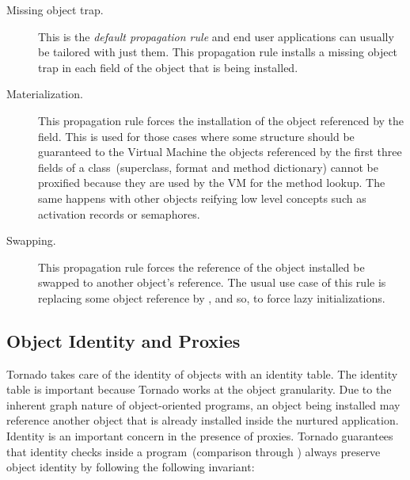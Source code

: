 \begin{description}
\item[Missing object trap.] This is the \emph{default propagation rule} and end user applications can usually be tailored with just them. This propagation rule installs a missing object trap in each field of the object that is being installed.
\item[Materialization.] This propagation rule forces the installation of the object referenced by the field. This is used for those cases where some structure should be guaranteed to the Virtual Machine \eg the objects referenced by the first three fields of a class~(superclass, format and method dictionary) cannot be proxified because they are used by the VM for the method lookup. The same happens with other objects reifying low level concepts such as activation records or semaphores.
\item[Swapping.] This propagation rule forces the reference of the object installed be swapped to another object's reference. The usual use case of this rule is replacing some object reference by , and so, to force lazy initializations.
\end{description}

%

\subsection{Object Identity and Proxies}

Tornado takes care of the identity of objects with an identity table. The identity table is important because Tornado works at the object granularity. Due to the inherent graph nature of object-oriented programs, an object being installed may reference another object that is already installed inside the nurtured application.
Identity is an important concern in the presence of proxies. Tornado guarantees that identity checks inside a program~(\eg comparison through \ct{==}) always preserve object identity by following the following invariant: 


